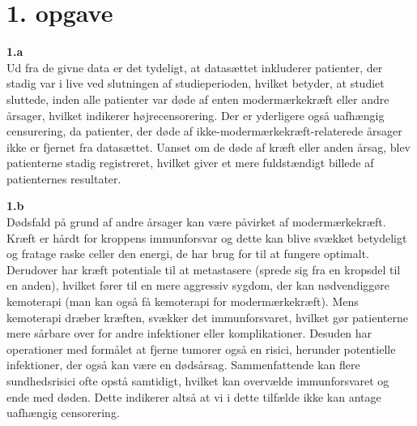 \chapter{1. opgave}

\textbf{1.a} \\
\noindent Ud fra de givne data er det tydeligt, at datasættet inkluderer patienter, der stadig var i live ved slutningen af studieperioden, hvilket betyder, at studiet sluttede, inden alle patienter var døde af enten modermærkekræft eller andre årsager, hvilket indikerer højrecensorering. Der er yderligere også uafhængig censurering, da patienter, der døde af ikke-modermærkekræft-relaterede årsager ikke er fjernet fra datasættet. Uanset om de døde af kræft eller anden årsag, blev patienterne stadig registreret, hvilket giver et mere fuldstændigt billede af patienternes resultater.\pause[3em]

\noindent\textbf{1.b}\\
\noindent Dødsfald på grund af andre årsager kan være påvirket af modermærkekræft. Kræft er hårdt for kroppens immunforsvar og dette kan blive svækket betydeligt og fratage raske celler den energi, de har brug for til at fungere optimalt. Derudover har kræft potentiale til at metastasere (sprede sig fra en kropsdel til en anden), hvilket fører til en mere aggressiv sygdom, der kan nødvendiggøre kemoterapi (man kan også få kemoterapi for modermærkekræft). Mens kemoterapi dræber kræften, svækker det immunforsvaret, hvilket gør patienterne mere sårbare over for andre infektioner eller komplikationer. Desuden har operationer med formålet at fjerne tumorer også en risici, herunder potentielle infektioner, der også kan være en dødsårsag. Sammenfattende kan flere sundhedsrisici ofte opstå samtidigt, hvilket kan overvælde immunforsvaret og ende med døden. Dette indikerer altså at vi i dette tilfælde ikke kan antage uafhængig censorering.



